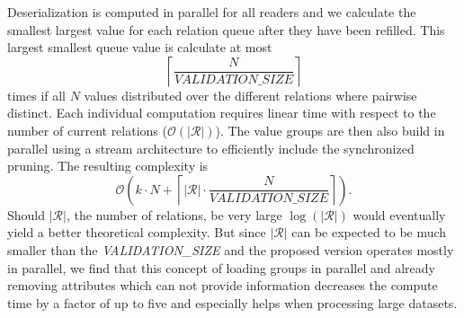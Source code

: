 Deserialization is computed in parallel for all readers and we calculate the smallest largest value for each relation queue after they have been refilled. This largest smallest queue value is calculate at most $$\left \lceil\frac{N}{\textit{VALIDATION\_SIZE}}\right \rceil$$ times if all $N$ values distributed over the different relations where pairwise distinct. Each individual computation requires linear time with respect to the number of current relations ($\mathcal{O}(|\mathcal{R}|)$). The value groups are then also build in parallel using a stream architecture to efficiently include the synchronized pruning. The resulting complexity is  $$\mathcal{O} \left( k \cdot N + \left \lceil |\mathcal{R}| \cdot \frac{N}{\textit{VALIDATION\_SIZE}}\right \rceil \right ).$$ Should $|\mathcal{R}|$, the number of relations, be very large $\log(|\mathcal{R}|)$ would eventually yield a better theoretical complexity. But since $|\mathcal{R}|$ can be expected to be much smaller than the \textit{VALIDATION\_SIZE} and the proposed version operates mostly in parallel, we find that this concept of loading groups in parallel and already removing attributes which can not provide information decreases the compute time by a factor of up to five and especially helps when processing large datasets.

